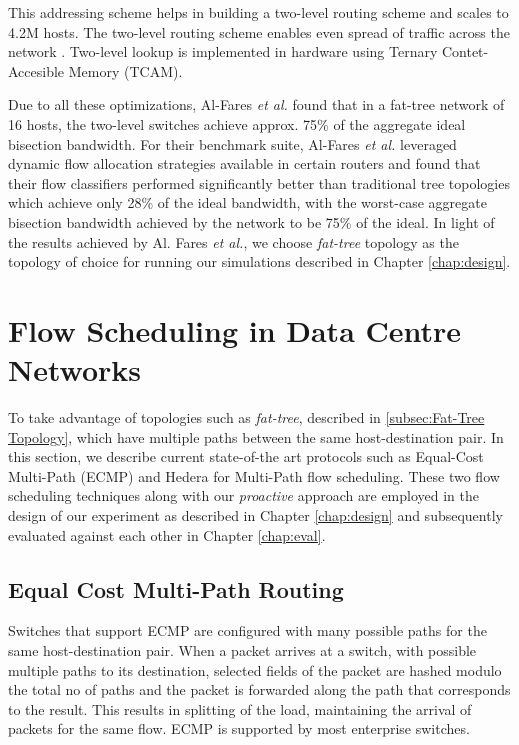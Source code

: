 This addressing scheme helps in building a two-level routing scheme and scales to 4.2M hosts. The two-level routing scheme enables even spread of traffic across the network \cite{al2008scalable}. Two-level lookup is implemented in hardware using Ternary Contet-Accesible Memory (TCAM).

Due to all these optimizations, Al-Fares \textit{et al.} \cite{al2008scalable} found that in a fat-tree network of 16 hosts, the two-level switches achieve approx. 75\% of the aggregate ideal bisection bandwidth. For their benchmark suite, Al-Fares \textit{et al.} leveraged dynamic flow allocation strategies available in certain routers and found that their flow classifiers performed significantly better than traditional tree topologies which achieve only 28\% of the ideal bandwidth, with the worst-case aggregate bisection bandwidth achieved by the network to be 75\% of the ideal. In light of the results achieved by Al. Fares \textit{et al.}, we choose \textit{fat-tree} topology as the topology of choice for running our simulations described in Chapter \ref{chap:design}.

 
\section{Flow Scheduling in Data Centre Networks} \label{sec:Flow Scheduling in Data Centres}

To take advantage of topologies such as \textit{fat-tree}, described in \ref{subsec:Fat-Tree Topology}, which have multiple paths between the same host-destination pair. In this section, we describe current state-of-the art protocols such as Equal-Cost Multi-Path (ECMP) \cite{hopps2000analysis} and Hedera \cite{al2010hedera} for Multi-Path flow scheduling. These two flow scheduling techniques along with our \textit{proactive} approach are employed in the design of our experiment as described in Chapter \ref{chap:design} and subsequently evaluated against each other in Chapter \ref{chap:eval}.

\subsection{Equal Cost Multi-Path Routing} \label{subsec:ECMP}

Switches that support ECMP are configured with many possible paths for the same host-destination pair. When a packet arrives at a switch, with possible multiple paths to its destination, selected fields of the packet are hashed modulo the total no of paths and the packet is forwarded along the path that corresponds to the result. This results in splitting of the load, maintaining the arrival of packets for the same flow. ECMP is supported by most enterprise switches.

